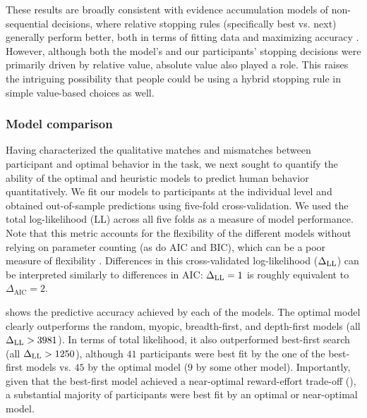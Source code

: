 These results are broadly consistent with evidence accumulation models of non-sequential decisions, where relative stopping rules (specifically best vs. next) generally perform better, both in terms of fitting data \citep{ratcliff2004comparison,teodorescu2013disentangling} and maximizing accuracy \citep{mcmillen2006dynamics,bogacz2006physics}. However, although both the model's and our participants' stopping decisions were primarily driven by relative value, absolute value also played a role. This raises the intriguing possibility that people could be using a hybrid stopping rule in simple value-based choices as well.

\subsubsection{Model comparison}\label{sec:planning-comparison}
Having characterized the qualitative matches and mismatches between participant and optimal behavior in the task, we next sought to quantify the ability of the optimal and heuristic models to predict human behavior quantitatively.
%
We fit our models to participants at the individual level and obtained out-of-sample predictions using five-fold cross-validation. We used the total log-likelihood (LL) across all five folds as a measure of model performance. Note that this metric accounts for the flexibility of the different models without relying on parameter counting (as do AIC and BIC), which can be a poor measure of flexibility \citep{piantadosi2018one}. Differences in this cross-validated log-likelihood ($\Delta_{\mathrm{LL}}$) can be interpreted similarly to differences in AIC: $\Delta_{\mathrm{LL}} = 1$ is roughly equivalent to $\Delta_{\mathrm{AIC}} = 2$.

 shows the predictive accuracy achieved by each of the models. The optimal model clearly outperforms the random, myopic, breadth-first, and depth-first models (all $\Delta_{\mathrm{LL}} > 3981$). In terms of total likelihood, it also outperformed best-first search (all $\Delta_{\mathrm{LL}} > 1250$), although $41$ participants were best fit by the one of the best-first models vs. $45$ by the optimal model ($9$ by some other model). Importantly, given that the best-first model achieved a near-optimal reward-effort trade-off (), a substantial majority of participants were best fit by an optimal or near-optimal model.
%



